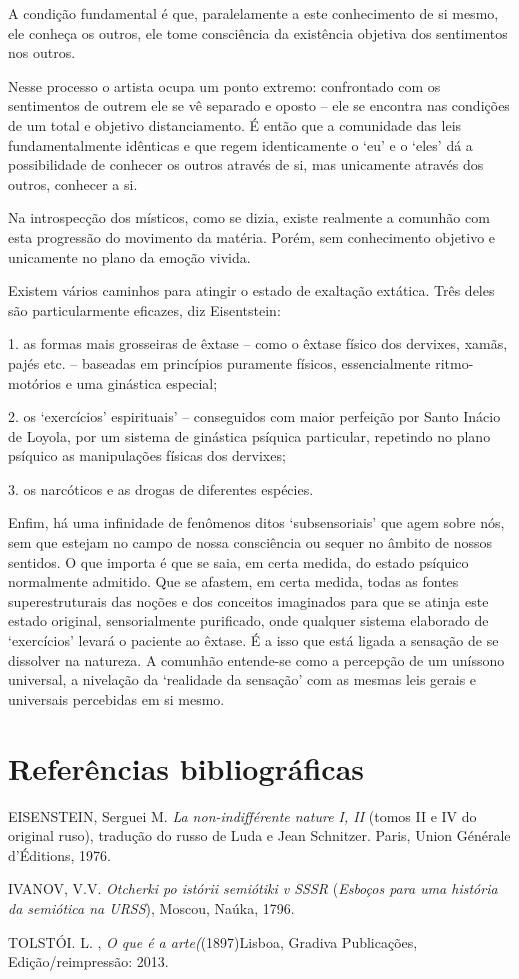 A condição fundamental é que, paralelamente a este conhecimento de si
mesmo, ele conheça os outros, ele tome consciência da existência
objetiva dos sentimentos nos outros.

Nesse processo o artista ocupa um ponto extremo: confrontado com os
sentimentos de outrem ele se vê separado e oposto -- ele se encontra nas
condições de um total e objetivo distanciamento. É então que a
comunidade das leis fundamentalmente idênticas e que regem identicamente
o `eu' e o `eles' dá a possibilidade de conhecer os outros através de
si, mas unicamente através dos outros, conhecer a si.

Na introspecção dos místicos, como se dizia, existe realmente a comunhão
com esta progressão do movimento da matéria. Porém, sem conhecimento
objetivo e unicamente no plano da emoção vivida.

Existem vários caminhos para atingir o estado de exaltação extática.
Três deles são particularmente eficazes, diz Eisentstein:

1. as formas mais grosseiras de êxtase -- como o êxtase físico dos
dervixes, xamãs, pajés etc. -- baseadas em princípios puramente físicos,
essencialmente ritmo-motórios e uma ginástica especial;

2. os `exercícios' espirituais' -- conseguidos com maior perfeição por
Santo Inácio de Loyola, por um sistema de ginástica psíquica particular,
repetindo no plano psíquico as manipulações físicas dos dervixes;

3. os narcóticos e as drogas de diferentes espécies.

Enfim, há uma infinidade de fenômenos ditos `subsensoriais' que agem
sobre nós, sem que estejam no campo de nossa consciência ou sequer no
âmbito de nossos sentidos. O que importa é que se saia, em certa medida,
do estado psíquico normalmente admitido. Que se afastem, em certa
medida, todas as fontes superestruturais das noções e dos conceitos
imaginados para que se atinja este estado original, sensorialmente
purificado, onde qualquer sistema elaborado de `exercícios' levará o
paciente ao êxtase. É a isso que está ligada a sensação de se dissolver
na natureza. A comunhão entende-se como a percepção de um uníssono
universal, a nivelação da `realidade da sensação' com as mesmas leis
gerais e universais percebidas em si mesmo.

\section{Referências bibliográficas}

EISENSTEIN, Serguei M. \emph{La non-indifférente nature I, II} (tomos II
e IV do original ruso), tradução do russo de Luda e Jean Schnitzer.
Paris, Union Générale d'Éditions, 1976.

IVANOV, V.V. \emph{Otcherki po istórii semiótiki v SSSR} (\emph{Esboços
para uma história da semiótica na URSS}), Moscou, Naúka, 1796.

TOLSTÓI. L. , \emph{O que é a arte(}(1897)Lisboa, Gradiva Publicações,
Edição/reimpressão: 2013.
